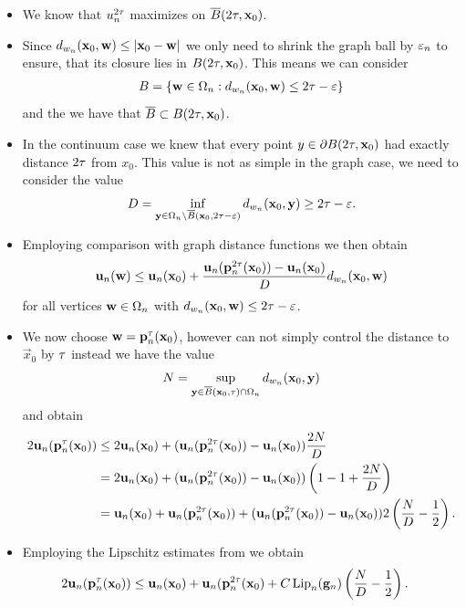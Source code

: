 \begin{itemize}
\item We know that $u_n^{2\tau}$ maximizes on $\overline{B}(2\tau, \mathbf{x}_0)$.
\item Since $d_{w_n}(\mathbf{x}_0, \mathbf{w}) \leq \left|\mathbf{x}_0 - \mathbf{w}\right|$ we only need to shrink the graph ball by $\varepsilon_n$ to ensure, that its closure lies in $B(2\tau, \mathbf{x}_0)$. This means we can consider 
%
\begin{align*}
B =\{\mathbf{w} \in\Omega_n: d_{w_n}(\mathbf{x}_0,\mathbf{w})\leq 2\tau-\varepsilon\}
\end{align*}
%
and the we have that $\overline{B} \subset B(2\tau, \mathbf{x}_0)$.
%
\item In the continuum case we knew that every point $y\in \partial B(2\tau, \mathbf{x}_0)$ had exactly distance $2\tau$ from $x_0$. This value is not as simple in the graph case, we need to consider the value
%
\begin{align*}
D = \inf_{\mathbf{y}\in \Omega_n\setminus \overline{B}(\mathbf{x}_0, 2\tau - \varepsilon)} d_{w_n}(\mathbf{x}_0, \mathbf{y})\geq 2\tau -\varepsilon.
\end{align*}
%
\item Employing comparison with graph distance functions we then obtain
%
\begin{align}\label{ineq:comparison_with_cone}
\mathbf{u}_n(\mathbf{w}) \leq 
\mathbf{u}_n(\mathbf{x}_0) + 
\frac{\mathbf{u}_n(\mathbf{p}_n^{2\tau}(\mathbf{x}_0)) - \mathbf{u}_n(\mathbf{x}_0)}{D} 
d_{w_n}(\mathbf{x}_0, \mathbf{w})
\end{align}
%
for all vertices $\mathbf{w} \in\Omega_n$ with $d_{w_n}(\mathbf{x}_0,\mathbf{w})\leq 2\tau -\varepsilon$.
%
\item We now choose $\mathbf{w} = \mathbf{p}_n^\tau(\mathbf{x}_0)$, however can not simply control the distance to $\vec x_0$ by $\tau$ instead we have the value
%
\begin{align*}
N = \sup_{\mathbf{y}\in\overline{B}(\mathbf{x}_0, \tau)\cap\Omega_n} d_{w_n}(\mathbf{x}_0, \mathbf{y})
\end{align*}
%
and obtain
%
\begin{align*}
2 \mathbf{u}_n(\mathbf{p}_n^\tau(\mathbf{x}_0)) &\leq 
2\mathbf{u}_n(\mathbf{x}_0) +
(\mathbf{u}_n(\mathbf{p}_n^{2\tau}(\mathbf{x}_0)) - \mathbf{u}_n(\mathbf{x}_0)) \frac{2N}{D}\\
&= 
2\mathbf{u}_n(\mathbf{x}_0) +
(\mathbf{u}_n(\mathbf{p}_n^{2\tau}(\mathbf{x}_0)) - \mathbf{u}_n(\mathbf{x}_0)) \left( 1 - 1 + \frac{2N}{D}\right)\\
&=
\mathbf{u}_n(\mathbf{x}_0) + \mathbf{u}_n(\mathbf{p}_n^{2\tau}(\mathbf{x}_0)) 
+ 
(\mathbf{u}_n(\mathbf{p}_n^{2\tau}(\mathbf{x}_0)) - \mathbf{u}_n(\mathbf{x}_0)) 2\left(\frac{N}{D} - \frac{1}{2}\right).
\end{align*}
%
\item Employing the Lipschitz estimates from \cite[Sec. 5.1]{bungert2021uniform} we obtain 
%
\begin{align*}
2 \mathbf{u}_n(\mathbf{p}_n^\tau(\mathbf{x}_0)) &\leq 
\mathbf{u}_n(\mathbf{x}_0) + \mathbf{u}_n(\mathbf{p}_n^{2\tau}(\mathbf{x}_0) 
+ 
C \operatorname{Lip}_n(\mathbf{g}_n)\left(\frac{N}{D} - \frac{1}{2}\right).
\end{align*} 
\end{itemize}

